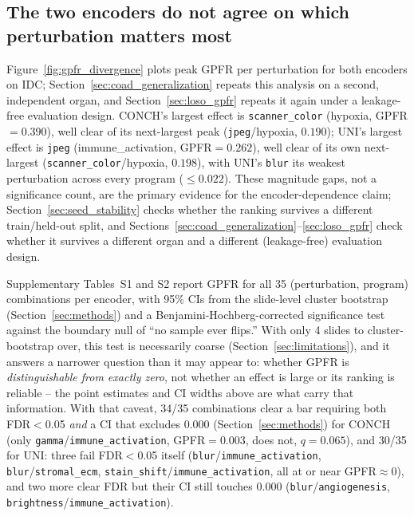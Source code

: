 \documentclass[11pt]{article}
\begin{document}


\subsection{The two encoders do not agree on which perturbation matters most}
\label{sec:encoder_dependent}
Figure~\ref{fig:gpfr_divergence} plots peak GPFR per perturbation for both encoders on IDC; Section~\ref{sec:coad_generalization} repeats this analysis on a second, independent organ, and Section~\ref{sec:loso_gpfr} repeats it again under a leakage-free evaluation design. CONCH's largest effect is \texttt{scanner\_color} (hypoxia, GPFR$=0.390$), well clear of its next-largest peak (\texttt{jpeg}/hypoxia, $0.190$); UNI's largest effect is \texttt{jpeg} (immune\_activation, GPFR$=0.262$), well clear of its own next-largest (\texttt{scanner\_color}/hypoxia, $0.198$), with UNI's \texttt{blur} its weakest perturbation across every program ($\le 0.022$). These magnitude gaps, not a significance count, are the primary evidence for the encoder-dependence claim; Section~\ref{sec:seed_stability} checks whether the ranking survives a different train/held-out split, and Sections~\ref{sec:coad_generalization}--\ref{sec:loso_gpfr} check whether it survives a different organ and a different (leakage-free) evaluation design.

Supplementary Tables~S1 and S2 report GPFR for all 35 (perturbation, program) combinations per encoder, with 95\% CIs from the slide-level cluster bootstrap (Section~\ref{sec:methods}) and a Benjamini-Hochberg-corrected significance test against the boundary null of ``no sample ever flips.'' With only 4 slides to cluster-bootstrap over, this test is necessarily coarse (Section~\ref{sec:limitations}), and it answers a narrower question than it may appear to: whether GPFR is \emph{distinguishable from exactly zero}, not whether an effect is large or its ranking is reliable -- the point estimates and CI widths above are what carry that information. With that caveat, 34/35 combinations clear a bar requiring both FDR$<$0.05 \emph{and} a CI that excludes 0.000 (Section~\ref{sec:methods}) for CONCH (only \texttt{gamma}/\texttt{immune\_activation}, GPFR$=0.003$, does not, $q=0.065$), and 30/35 for UNI: three fail FDR$<$0.05 itself (\texttt{blur}/\texttt{immune\_activation}, \texttt{blur}/\texttt{stromal\_ecm}, \texttt{stain\_shift}/\texttt{immune\_activation}, all at or near GPFR$\approx0$), and two more clear FDR but their CI still touches 0.000 (\texttt{blur}/\texttt{angiogenesis}, \texttt{brightness}/\texttt{immune\_activation}).
\end{document}
